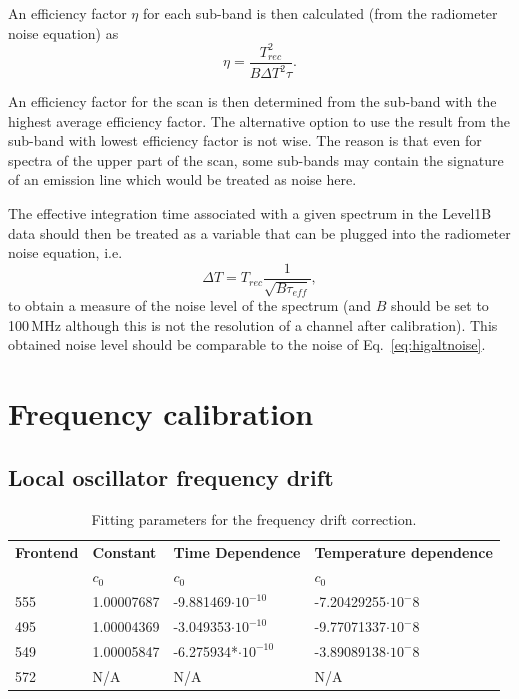 An efficiency factor \(\eta\) for each sub-band is then calculated (from the radiometer noise equation) as
\begin{equation}
\eta = \frac{T_{rec}^2}{B\Delta T^{2}\tau}.
\end{equation}

An efficiency factor for the scan is then determined from the sub-band
with the highest average efficiency factor. The alternative option
to use the result from the sub-band with lowest efficiency factor
is not wise. The reason is that even for spectra of the upper part
of the scan, some sub-bands may contain the signature of an emission 
line which would be treated as noise here.

The effective integration time associated with a given spectrum
in the Level1B data should then be treated as a 
variable that can be plugged into the radiometer noise equation,
i.e.
\begin{equation}
\Delta T = T_{rec}\frac{1}{\sqrt{B\tau_{eff}}},
\end{equation}
to obtain a measure of the noise level of the spectrum
(and \(B\) should be set to 100\,MHz although this is not
the resolution of a channel after calibration).
This obtained noise level should be comparable to the noise 
of Eq.~\ref{eq:higaltnoise}.


\section{Frequency calibration}

\subsection{Local oscillator frequency drift}

\begin{table}
\caption{Fitting parameters for the frequency drift correction.}
\label{table:freqcorr}
\begin{tabular}{|l|l|l|l|}
  \hline
  \textbf{Frontend} & \textbf{Constant}  & \textbf{Time Dependence}      & \textbf{Temperature dependence} \\
                    & \textbf{\(c_{0}\)} & \textbf{\(c_{0}\)}            & \textbf{\(c_{0}\)}              \\
  \hline
        555         & 1.00007687         & -9.881469\(\cdot10^{-10}\)    &  -7.20429255\(\cdot10^-{8}\)    \\
  \hline 
        495         & 1.00004369         & -3.049353\(\cdot10^{-10}\)    &  -9.77071337\(\cdot10^-{8}\)    \\
  \hline
        549         & 1.00005847         & -6.275934*\(\cdot10^{-10}\)   &  -3.89089138\(\cdot10^-{8}\)    \\
  \hline
        572         & N/A                & N/A                           & N/A                             \\
  \hline
\end{tabular}
\end{table}  

